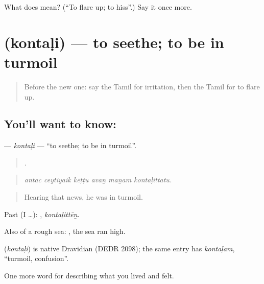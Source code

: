 \begin{tcolorbox}[breakable,colback=teal!4,colframe=teal!35!black,title={Before you move on}]
What does  mean? (\textquotedblleft{}To flare up; to hiss\textquotedblright{}.) Say it once more.
\end{tcolorbox}
\section[\texorpdfstring{\ta{கொந்தளி} (kontaḷi)}{கொந்தளி (kontaḷi)}]{ (kontaḷi) — to seethe; to be in turmoil}

\label{lesson:TA-C453-kontali}



\begin{quote}
Before the new one: say the Tamil for irritation, then the Tamil for to flare up.
\end{quote}

\subsection*{You'll want to know: }
\textbf{} — \emph{kontaḷi} — \textquotedblleft{}to seethe; to be in turmoil\textquotedblright{}.

\begin{quote}
     .
\end{quote}

\begin{quote}
\emph{antac ceytiyaik kēṭṭu avaṉ maṉam kontaḷittatu.}
\end{quote}

\begin{quote}
Hearing that news, he was in turmoil.
\end{quote}

Past (I …): , \emph{kontaḷittēṉ}.

Also of a rough sea:  , the sea ran high.

\begin{cousinweb}
\textbf{} (\emph{kontaḷi}) is native Dravidian (DEDR 2098); the same entry has  \emph{kontaḷam}, \textquotedblleft{}turmoil, confusion\textquotedblright{}.
\end{cousinweb}

\begin{grammarlens}[title={What you've built}]
One more word for describing what you lived and felt.
\end{grammarlens}

